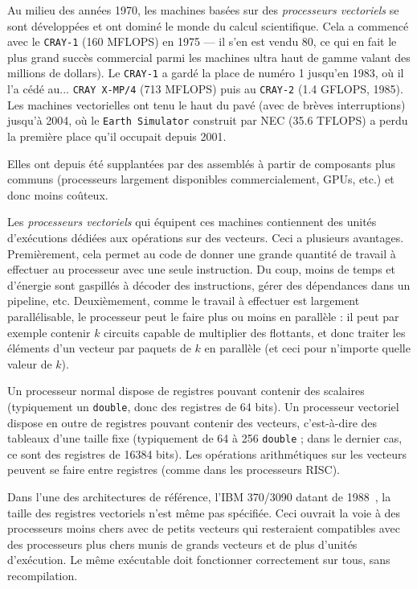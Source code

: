 Au milieu des années 1970, les machines basées sur des \emph{processeurs
  vectoriels} se sont développées et ont dominé le monde du calcul
scientifique. Cela a commencé avec le \texttt{CRAY-1} (160 MFLOPS) en 1975 ---
il s'en est vendu 80, ce qui en fait le plus grand succès commercial parmi les
machines ultra haut de gamme valant des millions de dollars). Le \texttt{CRAY-1}
a gardé la place de numéro 1 jusqu'en 1983, où il l'a cédé au... \texttt{CRAY
  X-MP/4} (713 MFLOPS) puis au \texttt{CRAY-2} (1.4 GFLOPS, 1985). Les machines
vectorielles ont tenu le haut du pavé (avec de brèves interruptions) jusqu'à
2004, où le \texttt{Earth Simulator} construit par NEC (35.6 TFLOPS) a perdu la
première place qu'il occupait depuis 2001.

Elles ont depuis été supplantées par des  assemblés à partir
de composants plus communs (processeurs largement disponibles commercialement,
GPUs, etc.) et donc moins coûteux.

Les \emph{processeurs vectoriels} qui équipent ces machines contiennent des
unités d'exécutions dédiées aux opérations sur des vecteurs. Ceci a plusieurs
avantages. Premièrement, cela permet au code de donner une grande quantité de
travail à effectuer au processeur avec une seule instruction. Du coup, moins de
temps et d'énergie sont gaspillés à décoder des instructions, gérer des
dépendances dans un pipeline, etc. Deuxièmement, comme le travail à effectuer
est largement parallélisable, le processeur peut le faire plus ou moins en
parallèle : il peut par exemple contenir $k$ circuits capable de multiplier des
flottants, et donc traiter les éléments d'un vecteur \og par paquets de $k$\fg
en parallèle (et ceci pour n'importe quelle valeur de $k$).

Un processeur normal dispose de registres pouvant contenir des scalaires
(typiquement un \texttt{double}, donc des registres de 64 bits). Un processeur
vectoriel dispose en outre de registres pouvant contenir des vecteurs,
c'est-à-dire des tableaux d'une taille fixe (typiquement de 64 à 256
\texttt{double} ; dans le dernier cas, ce sont des registres de 16384 bits).
Les opérations arithmétiques sur les vecteurs peuvent se faire entre registres
(comme dans les processeurs RISC).

Dans l'une des architectures de référence, l'IBM 370/3090 datant de
1988~\cite{PadegsMSB88}, la taille des registres vectoriels n'est même pas
spécifiée. Ceci ouvrait la voie à des processeurs moins chers avec de petits
vecteurs qui resteraient compatibles avec des processeurs plus chers munis de
grands vecteurs et de plus d'unités d'exécution. Le même exécutable doit
fonctionner correctement sur tous, sans recompilation.

